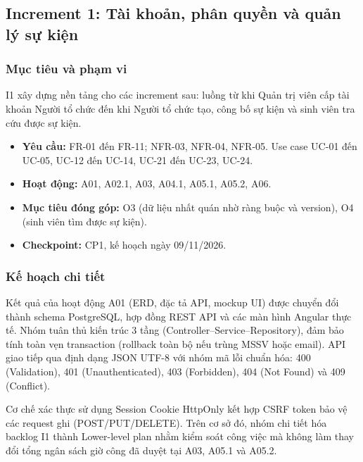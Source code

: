 \subsection{Increment 1: Tài khoản, phân quyền và quản lý sự kiện}
\label{sec:i1-development}

\subsubsection{Mục tiêu và phạm vi}

I1 xây dựng nền tảng cho các increment sau: luồng từ khi Quản trị viên cấp tài khoản Người tổ chức đến khi Người tổ chức tạo, công bố sự kiện và sinh viên tra cứu được sự kiện.

\begin{itemize}
    \item \textbf{Yêu cầu:} FR-01 đến FR-11; NFR-03, NFR-04, NFR-05. Use case UC-01 đến UC-05, UC-12 đến UC-14, UC-21 đến UC-23, UC-24.
    \item \textbf{Hoạt động:} A01, A02.1, A03, A04.1, A05.1, A05.2, A06.
    \item \textbf{Mục tiêu đóng góp:} O3 (dữ liệu nhất quán nhờ ràng buộc và version), O4 (sinh viên tìm được sự kiện).
    \item \textbf{Checkpoint:} CP1, kế hoạch ngày 09/11/2026.
\end{itemize}

\subsubsection{Kế hoạch chi tiết}

Kết quả của hoạt động A01 (ERD, đặc tả API, mockup UI) được chuyển đổi thành schema PostgreSQL, hợp đồng REST API và các màn hình Angular thực tế. Nhóm tuân thủ kiến trúc 3 tầng (Controller--Service--Repository), đảm bảo tính toàn vẹn transaction (rollback toàn bộ nếu trùng MSSV hoặc email). API giao tiếp qua định dạng JSON UTF-8 với nhóm mã lỗi chuẩn hóa: 400 (Validation), 401 (Unauthenticated), 403 (Forbidden), 404 (Not Found) và 409 (Conflict). 

Cơ chế xác thực sử dụng Session Cookie HttpOnly kết hợp CSRF token bảo vệ các request ghi (POST/PUT/DELETE). Trên cơ sở đó, nhóm chi tiết hóa backlog I1 thành Lower-level plan nhằm kiểm soát công việc mà không làm thay đổi tổng ngân sách giờ công đã duyệt tại A03, A05.1 và A05.2.

